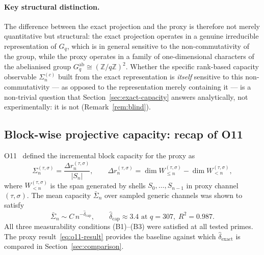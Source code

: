     \paragraph{Key structural distinction.}
      The difference between the exact projection and the proxy is therefore not
      merely quantitative but structural:
      the exact projection operates in a genuine irreducible representation of $G_q$,
      which is in general sensitive to the non-commutativity of the group,
      while the proxy operates in a family of one-dimensional characters of the
      abelianised group $G_q^{\mathrm{ab}}\cong(\mathbb{Z}/q\mathbb{Z})^2$.
      Whether the specific rank-based capacity observable $\Sigma_n^{(c)}$ built from the
      exact representation is \emph{itself} sensitive to this non-commutativity — as opposed
      to the representation merely containing it — is a non-trivial question that
      Section~\ref{sec:exact-capacity} answers analytically, not experimentally: it is not
      (Remark~\ref{rem:blind}).

\subsection{Block-wise projective capacity: recap of O11}
  \label{sec:o11-recap}

  O11~\cite{Beau2026a15} defined the incremental block capacity for the proxy as
  \begin{equation}
    \Sigma_n^{(\tau,\sigma)}
    = \frac{\Delta r_n^{(\tau,\sigma)}}{|S_n|},
    \qquad
    \Delta r_n^{(\tau,\sigma)}
    = \dim W_{\leq n}^{(\tau,\sigma)} - \dim W_{<n}^{(\tau,\sigma)},
  \end{equation}
  where $W_{<n}^{(\tau,\sigma)}$ is the span generated by shells $S_0,\ldots,S_{n-1}$
  in proxy channel $(\tau,\sigma)$.
  The mean capacity $\bar{\Sigma}_n$ over sampled generic channels was shown to satisfy
  \begin{equation}
    \bar{\Sigma}_n \sim C\,n^{-\hat{\delta}_{\mathrm{cap}}},
    \qquad
    \hat{\delta}_{\mathrm{cap}} \approx 3.4 \text{ at } q=307,\; R^2=0.987.
    \label{eq:o11-result}
  \end{equation}
  All three measurability conditions (B1)--(B3) were satisfied at all tested primes.
  The proxy result~\eqref{eq:o11-result} provides the baseline against which
  $\hat{\delta}_{\mathrm{exact}}$ is compared in Section~\ref{sec:comparison}.

